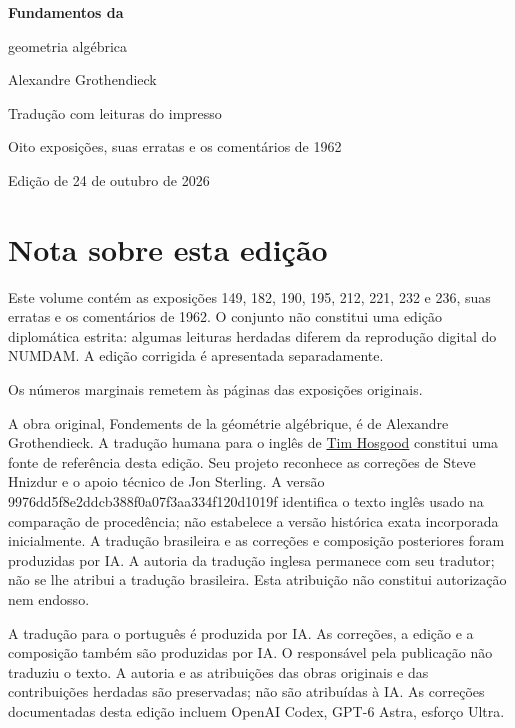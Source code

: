 \documentclass[11pt,twoside,openany]{book}
\begin{document}
\frontmatter
\begin{titlepage}
\centering
\vspace*{0.13\textheight}
{\Huge\bfseries Fundamentos da\par geometria algébrica\par}
\vspace{1.5\baselineskip}
{\Large Alexandre Grothendieck\par}
\vfill
{\Large Tradução com leituras do impresso\par}
\vspace{\baselineskip}
{\large Oito exposições, suas erratas e os comentários de 1962\par}
\vspace{1.5\baselineskip}
{\normalsize Edição de 24 de outubro de 2026\par}
\end{titlepage}
\chapter*{Nota sobre esta edição}
Este volume contém as exposições 149, 182, 190, 195, 212, 221, 232 e 236, suas erratas e os comentários de 1962. O conjunto não constitui uma edição diplomática estrita: algumas leituras herdadas diferem da reprodução digital do NUMDAM. A edição corrigida é apresentada separadamente.

Os números marginais remetem às páginas das exposições originais.

A obra original, Fondements de la géométrie algébrique, é de Alexandre Grothendieck. A tradução humana para o inglês de \href{https://github.com/thosgood/fga/tree/9976dd5f8e2ddcb388f0a07f3aa334f120d1019f}{Tim Hosgood} constitui uma fonte de referência desta edição. Seu projeto reconhece as correções de Steve Hnizdur e o apoio técnico de Jon Sterling. A versão 9976dd5f8e2ddcb388f0a07f3aa334f120d1019f identifica o texto inglês usado na comparação de procedência; não estabelece a versão histórica exata incorporada inicialmente. A tradução brasileira e as correções e composição posteriores foram produzidas por IA. A autoria da tradução inglesa permanece com seu tradutor; não se lhe atribui a tradução brasileira. Esta atribuição não constitui autorização nem endosso.

A tradução para o português é produzida por IA. As correções, a edição e a composição também são produzidas por IA. O responsável pela publicação não traduziu o texto. A autoria e as atribuições das obras originais e das contribuições herdadas são preservadas; não são atribuídas à IA. As correções documentadas desta edição incluem OpenAI Codex, GPT-6 Astra, esforço Ultra.
\end{document}
